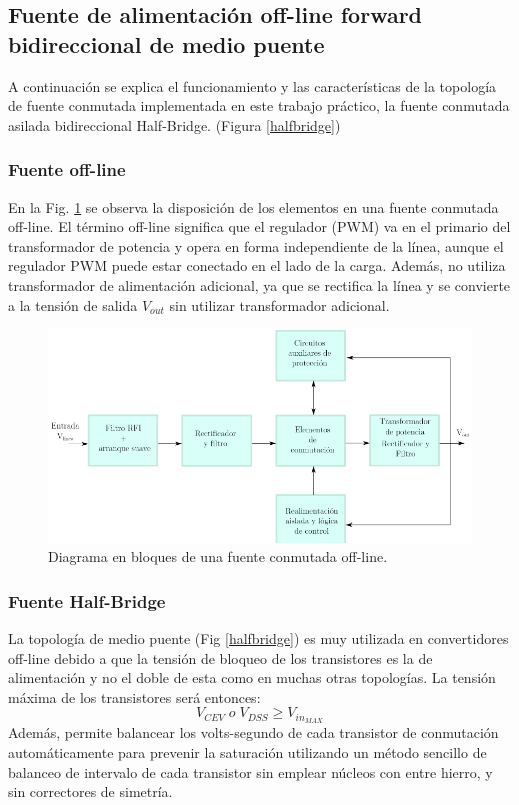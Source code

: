 \documentclass[11pt, a4paper]{article}
\begin{document}
\subsection{Fuente de alimentación off-line forward bidireccional de medio puente}
A continuación se explica el funcionamiento y las características de la topología de fuente conmutada implementada en este trabajo práctico, la fuente conmutada asilada bidireccional Half-Bridge. (Figura \ref{halfbridge})

\subsubsection{Fuente off-line}
En la Fig. \ref{esquema} se observa la disposición de los elementos en una fuente conmutada off-line. El término off-line significa que el regulador (PWM) va en el primario del transformador de potencia y opera en forma independiente de la línea, aunque el regulador PWM puede estar conectado en el lado de la carga. Además, no utiliza transformador de alimentación adicional, ya que se rectifica la línea y se convierte a la tensión de salida $V_{out}$ sin utilizar transformador adicional.
\begin{figure}[h]
	\centering
	\includegraphics[width = 12 cm]{Imagenes/esquema}
	\caption{Diagrama en bloques de una fuente conmutada off-line.}
	\label{esquema}
\end{figure}

\subsubsection{Fuente Half-Bridge}
La topología de medio puente (Fig \ref{halfbridge}) es muy utilizada en convertidores off-line debido a que la tensión de bloqueo de los transistores es la de alimentación y no el doble de esta como en muchas otras topologías. La tensión máxima de los transistores será entonces:
\[V_{CEV} \; o \; V_{DSS} \geq V_{in_{MAX}} \]
Además, permite balancear los volts-segundo de cada transistor de conmutación automáticamente para prevenir la saturación utilizando un método sencillo de balanceo de intervalo de cada transistor sin emplear núcleos con entre hierro, y sin correctores de simetría.
\end{document}
